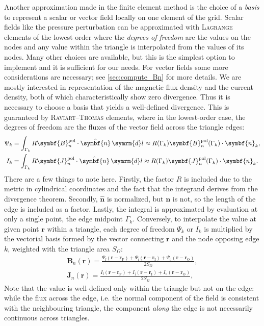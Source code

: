 \documentclass[a4paper, twoside, 10pt, english]{article}
\numberwithin{equation}{section}
\let\vec\symbf
\newcommand*\diff{\ensuremath{\symrm{d}}}  %
\newcommand*\pol{\ensuremath{\textrm{pol}}}  %
\newcommand*\fs{\ensuremath{\textrm{f}}}  %
\newcommand*\inw{\ensuremath{\textrm{i}}}  %
\newcommand*\out{\ensuremath{\textrm{o}}}  %
\newcommand*\vfs{\ensuremath{\textrm{F}}}  %
\newcommand*\vinw{\ensuremath{\textrm{I}}}  %
\newcommand*\vout{\ensuremath{\textrm{O}}}  %
\begin{document}
Another approximation made in the finite element method is the choice of a \emph{basis} to represent a scalar or vector field locally on one element of the grid. Scalar fields like the pressure perturbation can be approximated with \textsc{Lagrange} elements of the lowest order where the \emph{degrees of freedom} are the values on the nodes and any value within the triangle is interpolated from the values of its nodes. Many other choices are available, but this is the simplest option to implement and it is sufficient for our needs. For vector fields some more considerations are necessary; see \cref{sec:compute_Bn} for more details. We are mostly interested in representation of the magnetic flux density and the current density, both of which characteristically show zero divergence. Thus it is necessary to choose a basis that yields a well-defined divergence. This is guaranteed by \textsc{Raviart}--\textsc{Thomas} elements, where in the lowest-order case, the degrees of freedom are the fluxes of the vector field across the triangle edges:
\begin{gather}
  \Psi_{k} = \int_{\Gamma_{k}} R \vec{B}_{n}^{\pol} \cdot \hat{\vec{n}} \, \diff l \approx R (\Gamma_{k}) \vec{B}_{n}^{\pol} (\Gamma_{k}) \cdot \vec{n}_{k}, \label{eq:Psi_k} \\
  I_{k} = \int_{\Gamma_{k}} R \vec{J}_{n}^{\pol} \cdot \hat{\vec{n}} \, \diff l \approx R (\Gamma_{k}) \vec{J}_{n}^{\pol} (\Gamma_{k}) \cdot \vec{n}_{k}. \label{eq:I_k}
\end{gather}
There are a few things to note here. Firstly, the factor $R$ is included due to the metric in cylindrical coordinates and the fact that the integrand derives from the divergence theorem. Secondly, $\hat{\vec{n}}$ is normalized, but $\vec{n}$ is not, so the length of the edge is included as a factor. Lastly, the integral is approximated by evaluation at only a single point, the edge midpoint $\Gamma_{k}$. Conversely, to interpolate the value at given point $\vec{r}$ within a triangle, each degree of freedom $\Psi_{k}$ or $I_{k}$ is multiplied by the vectorial basis formed by the vector connecting $\vec{r}$ and the node opposing edge $k$, weighted with the triangle area $S_{\Omega}$:
\begin{gather}
  \vec{B}_{n} (\vec{r}) = \frac{\Psi_{\fs} (\vec{r} - \vec{r}_{\vfs}) + \Psi_{\inw} (\vec{r} - \vec{r}_{\vinw}) + \Psi_{\out} (\vec{r} - \vec{r}_{\vout})}{2 S_{\Omega}}, \\
  \vec{J}_{n} (\vec{r}) = \frac{I_{\fs} (\vec{r} - \vec{r}_{\vfs}) + I_{\inw} (\vec{r} - \vec{r}_{\vinw}) + I_{\out} (\vec{r} - \vec{r}_{\vout})}{2 S_{\Omega}},
\end{gather}
Note that the value is well-defined only within the triangle but not on the edge: while the flux across the edge, i.e. the normal component of the field is consistent with the neighbouring triangle, the component \emph{along} the edge is not necessarily continuous across triangles.
\end{document}
